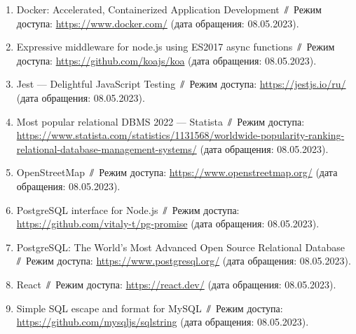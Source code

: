 \begin{enumerate}
    \item \label{docker} Docker: Accelerated, Containerized Application Development~$\sslash$~Режим доступа: \url{https://www.docker.com/} (дата обращения: 08.05.2023).
    \item \label{koa} Expressive middleware for node.js using ES2017 async functions~$\sslash$~Режим доступа: \url{https://github.com/koajs/koa} (дата обращения: 08.05.2023).
    \item \label{jest} Jest --- Delightful JavaScript Testing~$\sslash$~Режим доступа: \url{https://jestjs.io/ru/} (дата обращения: 08.05.2023).
    \item \label{dmbs} Most popular relational DBMS 2022 --- Statista~$\sslash$~Режим доступа: \url{https://www.statista.com/statistics/1131568/worldwide-popularity-ranking-relational-database-management-systems/} (дата обращения: 08.05.2023).
    \item \label{osm} OpenStreetMap~$\sslash$~Режим доступа: \url{https://www.openstreetmap.org/} (дата обращения: 08.05.2023).
    \item \label{pg-promise} PostgreSQL interface for Node.js~$\sslash$~Режим доступа: \url{https://github.com/vitaly-t/pg-promise} (дата обращения: 08.05.2023).
    \item \label{postgres} PostgreSQL: The World's Most Advanced Open Source Relational Database~$\sslash$~Режим доступа: \url{https://www.postgresql.org/} (дата обращения: 08.05.2023).
    \item \label{react} React~$\sslash$~Режим доступа: \url{https://react.dev/} (дата обращения: 08.05.2023).
    \item \label{sqlstring} Simple SQL escape and format for MySQL~$\sslash$~Режим доступа: \url{https://github.com/mysqljs/sqlstring} (дата обращения: 08.05.2023).
\end{enumerate}